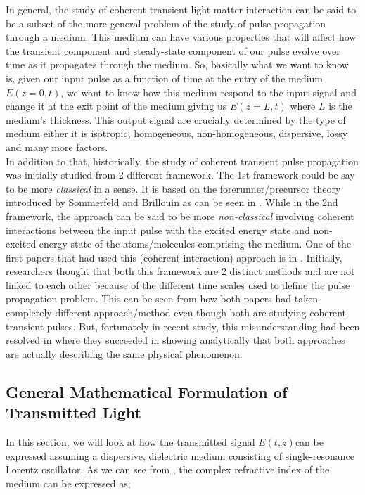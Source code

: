 In general, the study of coherent transient light-matter interaction can be said to be a subset of the more general problem of the study of pulse propagation through a medium. This medium can have various properties that will affect how the transient component and steady-state component of our pulse evolve over time as it propagates through the medium. So, basically what we want to know is, given our input pulse as a function of time at the entry of the medium $E(z = 0, t)$, we want to know how this medium respond to the input signal and change it at the exit point of the medium giving us $E(z = L, t)$ where $L$ is the medium's thickness. This output signal are crucially determined by the type of medium either it is isotropic, homogeneous, non-homogeneous, dispersive, lossy and many more factors.\\

In addition to that, historically, the study of coherent transient pulse propagation was initially studied from 2 different framework. The 1st framework could be say to be more \textit{classical} in a sense. It is based on the forerunner/precursor theory introduced by Sommerfeld and Brillouin as can be seen in \cite{brillouin1969wave}. While in the 2nd framework, the approach can be said to be more \textit{non-classical} involving coherent interactions between the input pulse with the excited energy state and non-excited energy state of the atoms/molecules comprising the medium. One of the first papers that had used this (coherent interaction) approach is in \cite{Crisp1970}. Initially, researchers thought that both this framework are 2 distinct methods and are not linked to each other because of the different time scales used to  define the pulse propagation problem. This can be seen from how both papers \cite{Segard_1987, Crisp1970} had taken completely different approach/method even though both are studying coherent transient pulses. But, fortunately in recent study, this misunderstanding had been resolved in \cite{Jeong2008} where they succeeded in showing analytically that both approaches are actually describing the same physical phenomenon.

\subsection{General Mathematical Formulation of Transmitted Light}
In this section, we will look at how the transmitted signal $E(t, z)$can be expressed assuming a dispersive, dielectric medium consisting of single-resonance Lorentz oscillator. As we can see from \cite{Jeong2011}, the complex refractive index of the medium can be expressed as;

